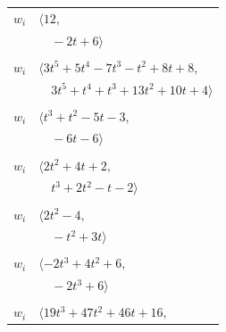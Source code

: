 \documentclass[11pt]{article}
\begin{document}
\begin{longtable}{@{}ll@{}}
$w_i$ & $\langle 12,$\\
 & $\quad -2t+6\rangle$\\
\addlinespace[2pt]
\multicolumn{2}{@{}p{0.97\textwidth}@{}}{$i=20$, $D_i=1$, $\rho_{ij}$: $4{:}2, \allowbreak 17{:}1, \allowbreak 22{:}1, \allowbreak 25{:}2, \allowbreak 27{:}2, \allowbreak 28{:}1, \allowbreak 31{:}2, \allowbreak 33{:}1, \allowbreak 34{:}1$}\\
$w_i$ & $\langle 3t^{5}+5t^{4}-7t^{3}-t^{2}+8t+8,$\\
 & $\quad 3t^{5}+t^{4}+t^{3}+13t^{2}+10t+4\rangle$\\
\addlinespace[2pt]
\multicolumn{2}{@{}p{0.97\textwidth}@{}}{$i=21$, $D_i=1$, $\rho_{ij}$: $1{:}1, \allowbreak 2{:}1, \allowbreak 23{:}1, \allowbreak 27{:}2, \allowbreak 33{:}1, \allowbreak 34{:}2, \allowbreak 36{:}1$}\\
$w_i$ & $\langle t^{3}+t^{2}-5t-3,$\\
 & $\quad -6t-6\rangle$\\
\addlinespace[2pt]
\multicolumn{2}{@{}p{0.97\textwidth}@{}}{$i=22$, $D_i=1$, $\rho_{ij}$: $2{:}2, \allowbreak 4{:}2, \allowbreak 15{:}2, \allowbreak 20{:}2, \allowbreak 25{:}1, \allowbreak 31{:}1, \allowbreak 34{:}1$}\\
$w_i$ & $\langle 2t^{2}+4t+2,$\\
 & $\quad t^{3}+2t^{2}-t-2\rangle$\\
\addlinespace[2pt]
\multicolumn{2}{@{}p{0.97\textwidth}@{}}{$i=23$, $D_i=1$, $\rho_{ij}$: $7{:}2, \allowbreak 8{:}1, \allowbreak 13{:}1, \allowbreak 14{:}1, \allowbreak 15{:}1, \allowbreak 21{:}2, \allowbreak 30{:}1, \allowbreak 35{:}1$}\\
$w_i$ & $\langle 2t^{2}-4,$\\
 & $\quad -t^{2}+3t\rangle$\\
\addlinespace[2pt]
\multicolumn{2}{@{}p{0.97\textwidth}@{}}{$i=24$, $D_i=1$, $\rho_{ij}$: $5{:}1, \allowbreak 6{:}1, \allowbreak 12{:}1, \allowbreak 27{:}2, \allowbreak 31{:}2, \allowbreak 32{:}1$}\\
$w_i$ & $\langle -2t^{3}+4t^{2}+6,$\\
 & $\quad -2t^{3}+6\rangle$\\
\addlinespace[2pt]
\multicolumn{2}{@{}p{0.97\textwidth}@{}}{$i=25$, $D_i=1$, $\rho_{ij}$: $0{:}1, \allowbreak 3{:}2, \allowbreak 5{:}2, \allowbreak 6{:}1, \allowbreak 7{:}1, \allowbreak 14{:}2, \allowbreak 19{:}2, \allowbreak 20{:}1, \allowbreak 22{:}2, \allowbreak 26{:}2, \allowbreak 32{:}1, \allowbreak 36{:}1$}\\
$w_i$ & $\langle 19t^{3}+47t^{2}+46t+16,$\\

\end{longtable}
\end{document}

